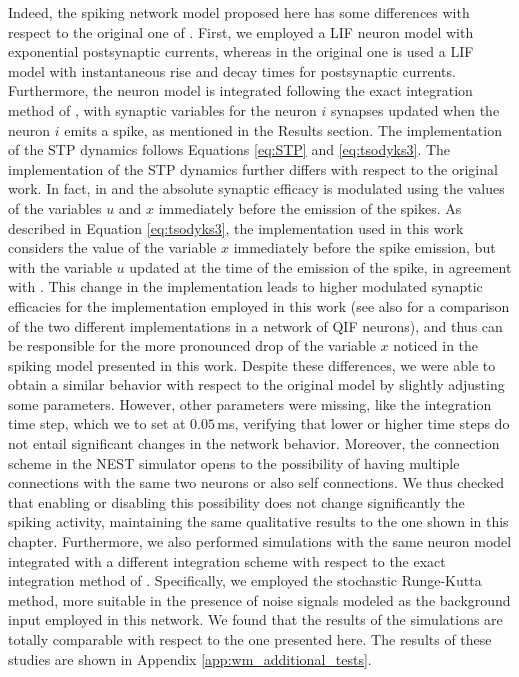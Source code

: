 \documentclass[a4paper, 12pt, twoside, openright]{book}
\begin{document}
Indeed, the spiking network model proposed here has some differences with respect to the original one of \cite{Mongillo2008}. First, we employed a LIF neuron model with exponential postsynaptic currents, whereas in the original one is used a LIF model with instantaneous rise and decay times for postsynaptic currents. Furthermore, the neuron model is integrated following the exact integration method of \cite{Rotter1999}, with synaptic variables for the neuron $i$ synapses updated when the neuron $i$ emits a spike, as mentioned in the Results section. The implementation of the STP dynamics follows Equations \eqref{eq:STP} and \eqref{eq:tsodyks3}. The implementation of the STP dynamics further differs with respect to the original work. In fact, in \cite{Mongillo2008} and \cite{mi_katkov_tsodyks2017} the absolute synaptic efficacy is modulated using the values of the variables $u$ and $x$ immediately before the emission of the spikes. As described in Equation \eqref{eq:tsodyks3}, the implementation used in this work considers the value of the variable $x$ immediately before the spike emission, but with the variable $u$ updated at the time of the emission of the spike, in agreement with \cite{tsodyks1998}. This change in the implementation leads to higher modulated synaptic efficacies for the implementation employed in this work (see also \cite{Gast2021} for a comparison of the two different implementations in a network of QIF neurons), and thus can be responsible for the more pronounced drop of the variable $x$ noticed in the spiking model presented in this work. Despite these differences, we were able to obtain a similar behavior with respect to the original model by slightly adjusting some parameters. However, other parameters were missing, like the integration time step, which we to set at $0.05$\,ms, verifying that lower or higher time steps do not entail significant changes in the network behavior. Moreover, the connection scheme in the NEST simulator opens to the possibility of having multiple connections with the same two neurons or also self connections. We thus checked that enabling or disabling this possibility does not change significantly the spiking activity, maintaining the same qualitative results to the one shown in this chapter. Furthermore, we also performed simulations with the same neuron model integrated with a different integration scheme with respect to the exact integration method of \cite{Rotter1999}. Specifically, we employed the stochastic Runge-Kutta method, more suitable in the presence of noise signals modeled as the background input employed in this network. We found that the results of the simulations are totally comparable with respect to the one presented here. The results of these studies are shown in Appendix \ref{app:wm_additional_tests}.
\end{document}
